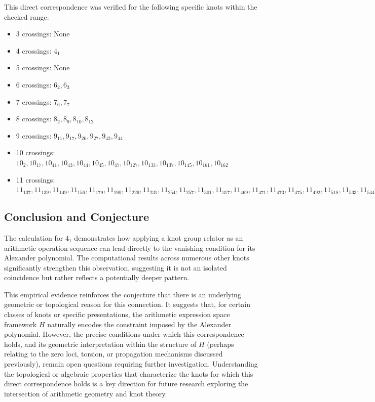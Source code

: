 \documentclass{article}[a4paper,12pt]
\begin{document}
This direct correspondence was verified for the following specific knots within the checked range:
\begin{itemize}
    \item 3 crossings: None
    \item 4 crossings: $4_1$
    \item 5 crossings: None
    \item 6 crossings: $6_2, 6_3$
    \item 7 crossings: $7_6, 7_7$
    \item 8 crossings: $8_2, 8_9, 8_{10}, 8_{12}$
    \item 9 crossings: $9_{11}, 9_{17}, 9_{26}, 9_{27}, 9_{42}, 9_{44}$
    \item 10 crossings: $10_2, 10_{17}, 10_{41}, 10_{43}, 10_{44}, 10_{45}, 10_{47}, 10_{127}, 10_{133}, 10_{137}, 10_{145}, 10_{161}, 10_{162}$
    \item 11 crossings: $11_{137}, 11_{139}, 11_{149}, 11_{156}, 11_{179}, 11_{190}, 11_{229}, 11_{231}, 11_{254}, 11_{257}, 11_{301}, 11_{317}, 11_{469}, 11_{471}, 11_{473}, 11_{475}, 11_{492}, 11_{518}, 11_{533}, 11_{544}$
\end{itemize}

\subsection{Conclusion and Conjecture}

The calculation for $4_1$ demonstrates how applying a knot group relator as an arithmetic operation sequence can lead directly to the vanishing condition for its Alexander polynomial. The computational results across numerous other knots significantly strengthen this observation, suggesting it is not an isolated coincidence but rather reflects a potentially deeper pattern.

This empirical evidence reinforces the conjecture that there is an underlying geometric or topological reason for this connection. It suggests that, for certain classes of knots or specific presentations, the arithmetic expression space framework $H$ naturally encodes the constraint imposed by the Alexander polynomial. However, the precise conditions under which this correspondence holds, and its geometric interpretation within the structure of $H$ (perhaps relating to the zero loci, torsion, or propagation mechanisms discussed previously), remain open questions requiring further investigation. Understanding the topological or algebraic properties that characterize the knots for which this direct correspondence holds is a key direction for future research exploring the intersection of arithmetic geometry and knot theory.
\end{document}
